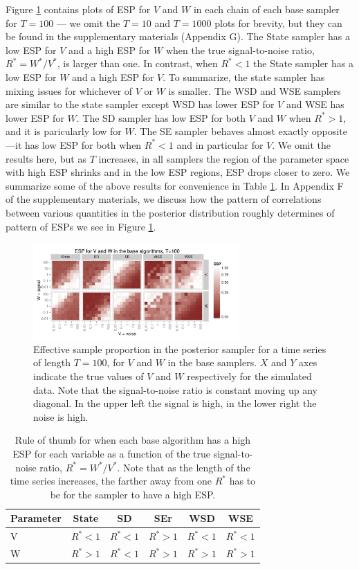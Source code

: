 \documentclass[12pt]{article}
\begin{document}
Figure \ref{baseESplot} contains plots of ESP for $V$ and $W$ in each chain of each base sampler for $T=100$ --- we omit the $T=10$ and $T=1000$ plots for brevity, but they can be found in the supplementary materials (Appendix G). The State sampler has a low ESP for $V$ and a high ESP for $W$ when the true signal-to-noise ratio, $R^*=W^*/V^*$, is larger than one. In contrast, when $R^*<1$ the State sampler has a low ESP for $W$ and a high ESP for $V$. To summarize, the state sampler has mixing issues for whichever of $V$ or $W$ is smaller. The WSD and WSE samplers are similar to the state sampler except WSD has lower ESP for $V$ and WSE has lower ESP for $W$. The SD sampler has low ESP for both $V$ and $W$ when $R^*>1$, and it is paricularly low for $W$. The SE sampler behaves almost exactly opposite ---it has low ESP for both when $R^*<1$ and in particular for $V$. We omit the results here, but as $T$ increases, in all samplers the region of the parameter space with high ESP shrinks and in the low ESP regions, ESP drops closer to zero. We summarize some of the above results for convenience in Table \ref{tab:stnmix}. In Appendix F of the supplementary materials, we discuss how the pattern of correlations between various quantities in the posterior distribution roughly determines of pattern of ESPs we see in Figure \ref{baseESplot}.

\begin{figure}[!h]
\centering
\includegraphics[width=0.7\textwidth]{baseESplot100}
\caption{Effective sample proportion in the posterior sampler for a time series of length $T=100$, for $V$ and $W$ in the base samplers. $X$ and $Y$ axes indicate the true values of $V$ and $W$ respectively for the simulated data. Note that the signal-to-noise ratio is constant moving up any diagonal. In the upper left the signal is high, in the lower right the noise is high.}
\label{baseESplot}
\end{figure}

\begin{table}
  \centering
  \begin{tabular}{|l|ccccc|}\hline
    Parameter & State & SD & SEr & WSD & WSE \\\hline
    V & $R^* < 1$ & $R^* < 1$ & $R^* > 1$ & $R^* < 1$ & $R^* < 1$\\
    W & $R^* > 1$ & $R^* < 1$ & $R^* > 1$ & $R^* > 1$ & $R^* > 1$ \\\hline
  \end{tabular}
  \caption{Rule of thumb for when each base algorithm has a high ESP for each variable as a function of the true signal-to-noise ratio, $R^*=W^*/V^*$. Note that as the length of the time series increases, the farther away from one $R^*$ has to be for the sampler to have a high ESP.}
  \label{tab:stnmix}
\end{table}
\end{document}
